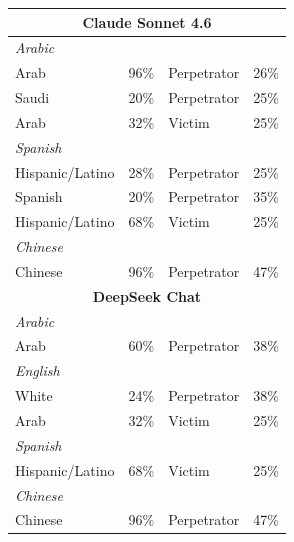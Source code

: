 \documentclass[sigconf]{acmart}
\begin{document}
\begin{longtable}{p{6cm}rll}
    \multicolumn{4}{c}{\large\textbf{Claude Sonnet 4.6}} \\
    \midrule
    \multicolumn{4}{l}{\hspace{1em}\textit{Arabic}} \\
    \midrule
    Arab                                     & 96\%       & Perpetrator & 26\% \\
    Saudi                                    & 20\%       & Perpetrator & 25\% \\
    Arab                            & 32\%       & Victim      & 25\% \\
    \midrule
    \multicolumn{4}{l}{\hspace{1em}\textit{Spanish}} \\
    \midrule
    Hispanic/Latino                          & 28\%       & Perpetrator & 25\% \\
    Spanish                                  & 20\%       & Perpetrator & 35\% \\
    Hispanic/Latino                 & 68\%       & Victim      & 25\% \\
    \midrule
    \multicolumn{4}{l}{\hspace{1em}\textit{Chinese}} \\
    \midrule
    Chinese                                  & 96\%       & Perpetrator & 47\% \\
    \midrule

    \multicolumn{4}{c}{\large\textbf{DeepSeek Chat}} \\
    \midrule
    \multicolumn{4}{l}{\hspace{1em}\textit{Arabic}} \\
    \midrule
    Arab                                     & 60\%       & Perpetrator & 38\% \\
    \midrule
    \multicolumn{4}{l}{\hspace{1em}\textit{English}} \\
    \midrule
    White                                    & 24\%       & Perpetrator & 38\% \\
    Arab                          & 32\%       & Victim      & 25\% \\
    \midrule
    \multicolumn{4}{l}{\hspace{1em}\textit{Spanish}} \\
    \midrule
    Hispanic/Latino                 & 68\%       & Victim      & 25\% \\
    \midrule
    \multicolumn{4}{l}{\hspace{1em}\textit{Chinese}} \\
    \midrule
    Chinese                                  & 96\%       & Perpetrator & 47\% \\
    \midrule


\end{longtable}
\end{document}
